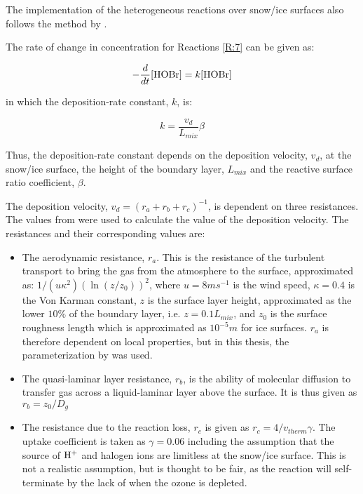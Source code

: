 The implementation of the heterogeneous reactions over snow/ice surfaces also follows the method by \cite{CAO}. 

\medskip

The rate of change in concentration for Reactions \ref{R:7} can be given as: 

\begin{equation*}
    -\frac{d}{dt}[\mathrm{HOBr}] = k[\mathrm{HOBr}]
\end{equation*}

in which the deposition-rate constant, $k$, is: 

\begin{equation*}
    k = \frac{v_d}{L_{mix}}\beta
\end{equation*}

Thus, the deposition-rate constant depends on the deposition velocity, $v_d$, at the snow/ice surface, the height of the boundary layer, $L_{mix}$ and the reactive surface ratio coefficient, $\beta$. 

\medskip

The deposition velocity, $v_d = (r_a + r_b + r_c)^{-1}$, is dependent on three resistances. The values from \cite{CAO} were used to calculate the value of the deposition velocity. The resistances and their corresponding values are: 

\begin{itemize}
    \item The aerodynamic resistance, $r_a$. This is the resistance of the turbulent transport to bring the gas from the atmosphere to the surface, approximated as: $1/(u\kappa^2)(\ln(z/z_0))^2$, where $u = 8 ms^{-1}$ is the wind speed, $\kappa = 0.4$ is the Von Karman constant, $z$ is the surface layer height, approximated as the lower $10\%$ of the boundary layer, i.e. $z = 0.1L_{mix}$, and $z_0$ is the surface roughness length which is approximated as $10^{-5} m$ for ice surfaces. $r_a$ is therefore dependent on local properties, but in this thesis, the parameterization by \cite{CAO} was used. 
    \item The quasi-laminar layer resistance, $r_b$, is the ability of molecular diffusion to transfer gas across a liquid-laminar layer above the surface. It is thus given as $r_b = z_0/D_g$
    \item The resistance due to the reaction loss, $r_c$ is given as $r_c = 4/v_{therm}\gamma$. The uptake coefficient is taken as $\gamma = 0.06$ including the assumption that the source of $\mathrm{H^+}$ and halogen ions are limitless at the snow/ice surface. This is not a realistic assumption, but is thought to be fair, as the reaction will self-terminate by the lack of  when the ozone is depleted. 
\end{itemize}

